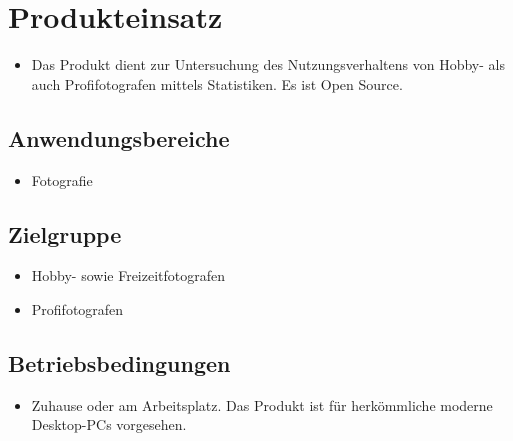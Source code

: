 \section{Produkteinsatz}
  \begin{itemize}
  \item Das Produkt dient zur Untersuchung des Nutzungsverhaltens von Hobby- als auch Profifotografen mittels Statistiken. Es ist Open Source.
  \end{itemize}
\subsection{Anwendungsbereiche}
  \begin{itemize}
  \item Fotografie
  \end{itemize}

\subsection{Zielgruppe}
	\begin{itemize}
		\item Hobby- sowie Freizeitfotografen
		\item Profifotografen		
	\end{itemize}

\subsection{Betriebsbedingungen}
  \begin{itemize}
  		\item Zuhause oder am Arbeitsplatz. Das Produkt ist für herkömmliche moderne Desktop-PCs vorgesehen.
  \end{itemize}
